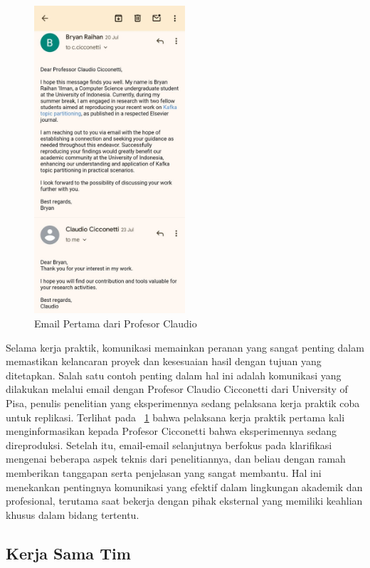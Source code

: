 \begin{figure}
	\centering
	\includegraphics[width=0.5\textwidth]
	{assets/pics/first-email.png}
	\caption{Email Pertama dari Profesor Claudio}
	\label{fig:first-email}
\end{figure}

Selama kerja praktik, komunikasi memainkan peranan yang sangat penting dalam memastikan kelancaran proyek dan kesesuaian hasil dengan tujuan yang ditetapkan. Salah satu contoh penting dalam hal ini adalah komunikasi yang dilakukan melalui email dengan Profesor Claudio Cicconetti dari University of Pisa, penulis penelitian yang eksperimennya sedang pelaksana kerja praktik coba untuk replikasi. Terlihat pada \pic~\ref{fig:first-email} bahwa pelaksana kerja praktik pertama kali menginformasikan kepada Profesor Cicconetti bahwa eksperimennya sedang direproduksi. Setelah itu, email-email selanjutnya berfokus pada klarifikasi mengenai beberapa aspek teknis dari penelitiannya, dan beliau dengan ramah memberikan tanggapan serta penjelasan yang sangat membantu. Hal ini menekankan pentingnya komunikasi yang efektif dalam lingkungan akademik dan profesional, terutama saat bekerja dengan pihak eksternal yang memiliki keahlian khusus dalam bidang tertentu.

\subsection{Kerja Sama Tim}

